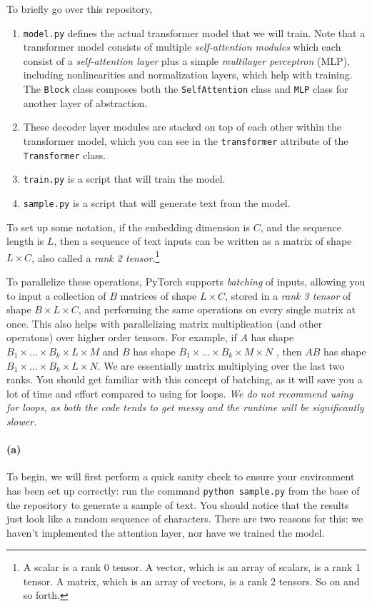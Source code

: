 \documentclass{exam}
\begin{document}
To briefly go over this repository, 
\begin{enumerate}
    \item \texttt{model.py} defines the actual transformer model that we will train. Note that a transformer model consists of multiple \textit{self-attention modules} which each consist of a \textit{self-attention layer} plus a simple \textit{multilayer perceptron} (MLP), including nonlinearities and normalization layers, which help with training. The \texttt{Block} class composes both the \texttt{SelfAttention} class and \texttt{MLP} class for another layer of abstraction. 
    \item These decoder layer modules are stacked on top of each other within the transformer model, which you can see in the \texttt{transformer} attribute of the \texttt{Transformer} class. 
    \item \texttt{train.py} is a script that will train the model. 
    \item \texttt{sample.py} is a script that will generate text from the model. 
\end{enumerate}

To set up some notation, if the embedding dimension is $C$, and the sequence length is $L$, then a sequence of text inputs can be written as a matrix of shape $L \times C$, also called a \textit{rank 2 tensor}.\footnote{A scalar is a rank 0 tensor. A vector, which is an array of scalars, is a rank 1 tensor. A matrix, which is an array of vectors, is a rank 2 tensors. So on and so forth.} 

To parallelize these operations, PyTorch supports \textit{batching} of inputs, allowing you to input a collection of $B$ matrices of shape $L \times C$, stored in a \textit{rank 3 tensor} of shape $B \times L \times C$, and performing the same operations on every single matrix at once. This also helps with parallelizing matrix multiplication (and other operatons) over higher order tensors. For example, if $A$ has shape $B_1 \times \ldots \times B_k \times L \times M$ and $B$ has shape $B_1 \times \ldots \times B_k \times M \times N$ , then $AB$ has shape $B_1 \times \ldots \times B_k \times L \times N$. We are essentially matrix multiplying over the last two ranks. You should get familiar with this concept of batching, as it will save you a lot of time and effort compared to using for loops. \textit{We do not recommend using for loops, as both the code tends to get messy and the runtime will be significantly slower.}

\paragraph{(a)} To begin, we will first perform a quick sanity check to ensure your environment has been set up correctly: run the command \texttt{python sample.py} from the base of the repository to generate a sample of text. You should notice that the results just look like a random sequence of characters. There are two reasons for this: we haven't implemented the attention layer, nor have we trained the model.
\end{document}
